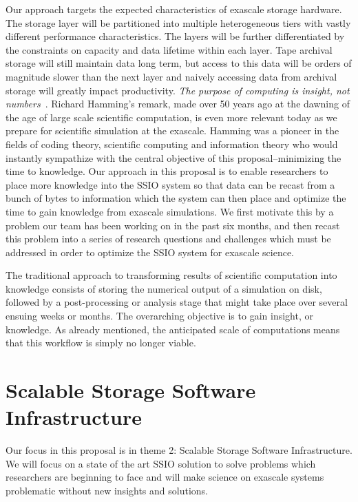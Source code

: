 Our approach targets the expected characteristics of exascale storage
hardware. The storage layer will be partitioned into multiple heterogeneous
tiers with vastly different performance characteristics. The layers
will be further differentiated by the constraints on capacity
and data lifetime within each layer. Tape archival storage will still maintain
data long term, but access to this data will be orders of magnitude slower
than the next layer and naively accessing data from archival storage will
greatly impact productivity.
%
{\em The purpose of computing is insight, not numbers}~\cite{Hamming:book}.
Richard Hamming's remark, made over 50 years ago at the dawning of the age of
large scale scientific computation, is even more relevant today as we prepare
for scientific simulation at the exascale. Hamming was a pioneer in the fields
of coding theory, scientific computing and information theory who would
instantly sympathize with the central objective of this proposal--minimizing
the time to knowledge.  Our approach in this proposal is to enable researchers
to place more knowledge into the SSIO system so that data can be recast from a bunch of bytes
to information which the system can then place and optimize the time to gain knowledge from exascale simulations.
We first motivate this by a problem our team has been working on in the past six months, and then recast this problem into
a series of research questions and challenges which must be addressed in order to optimize the SSIO system for exascale science.

The traditional approach to transforming results of scientific computation into
knowledge consists of storing the numerical output of a simulation on disk,
followed by a post-processing or analysis stage that might take place over
several ensuing weeks or months. The overarching objective is to gain insight,
or knowledge.  As already mentioned, the anticipated scale of computations
means that this workflow is simply no longer viable.
%
\section{Scalable Storage Software Infrastructure}
Our focus in this proposal is in theme 2: Scalable Storage Software Infrastructure. We will focus on a state of the art
SSIO solution to solve problems which researchers are beginning to face and will make science on exascale systems
problematic without new insights and solutions.

